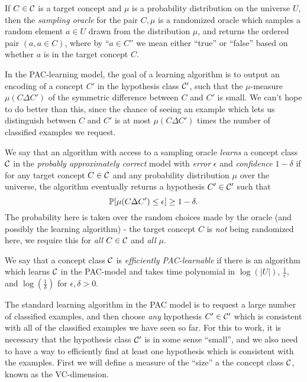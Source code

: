 \documentclass[letterpaper,11pt]{article}
\begin{document}
\begin{defn} If $C \in \mathcal{C}$ is a target concept and $\mu$ is a probability distribution on the universe $U$, then the \emph{sampling oracle} for the pair $C,\mu$ is a randomized oracle which samples a random element $a \in U$ drawn from the distribution $\mu$, and returns the ordered pair $(a,a \in C)$, where by ``$a \in C$'' we mean either ``true'' or ``false'' based on whether $a$ is in the target concept $C$.
\end{defn}

In the PAC-learning model, the goal of a learning algorithm is to output an encoding of a concept $C'$ in the hypothesis class $\mathcal{C}'$, such that the $\mu$-measure $\mu(C \Delta C')$ of the symmetric difference between $C$ and $C'$ is small. We can't hope to do better than this, since the chance of seeing an example which lets us distinguish between $C$ and $C'$ is at most $\mu(C \Delta C')$ times the number of classified examples we request.

\begin{defn} We say that an algorithm with access to a sampling oracle \emph{learns} a concept class $\mathcal{C}$ in the \emph{probably approximately correct} model with \emph{error} $\epsilon$ and \emph{confidence} $1-\delta$ if for any target concept $C \in \mathcal{C}$ and any probability distribution $\mu$ over the universe, the algorithm eventually returns a hypothesis $C' \in \mathcal{C}'$ such that
\[
\mathbb{P}[\mu(C \Delta C') \le \epsilon] \ge 1 - \delta.
\]
The probability here is taken over the random choices made by the oracle (and possibly the learning algorithm) - the target concept $C$ is \emph{not} being randomized here, we require this for \emph{all} $C \in \mathcal{C}$ and \emph{all} $\mu$.

We say that a concept class $\mathcal{C}$ is \emph{efficiently PAC-learnable} if there is an algorithm which learns $\mathcal{C}$ in the PAC-model and takes time polynomial in $\log(|U|)$, $\frac{1}{\epsilon}$, and $\log(\frac{1}{\delta})$ for $\epsilon, \delta > 0$.
\end{defn}

The standard learning algorithm in the PAC model is to request a large number of classified examples, and then choose \emph{any} hypothesis $C' \in \mathcal{C}'$ which is consistent with all of the classified examples we have seen so far. For this to work, it is necessary that the hypothesis class $\mathcal{C}'$ is in some sense ``small'', and we also need to have a way to efficiently find at least one hypothesis which is consistent with the examples. First we will define a measure of the ``size'' a the concept class $\mathcal{C}$, known as the VC-dimension.
\end{document}
